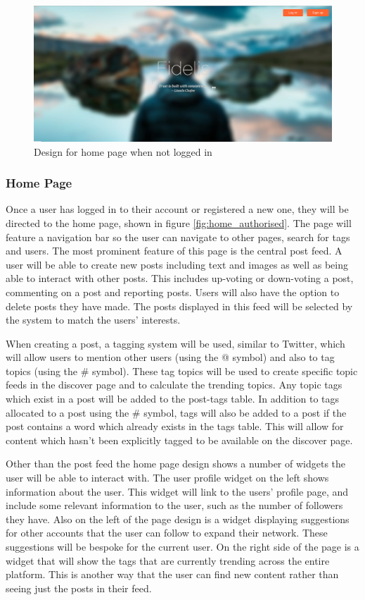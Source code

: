 \begin{figure}[H]
\centering
\includegraphics[width=\linewidth]{Images/Design/home_unauthorised}
\caption{Design for home page when not logged in}
\label{fig:home_unauthorised}
\end{figure}

\subsubsection{Home Page}
Once a user has logged in to their account or registered a new one, they will be directed to the home page, shown in figure \ref{fig:home_authorised}. The page will feature a navigation bar so the user can navigate to other pages, search for tags and users. The most prominent feature of this page is the central post feed. A user will be able to create new posts including text and images as well as being able to interact with other posts. This includes up-voting or down-voting a post, commenting on a post and reporting posts. Users will also have the option to delete posts they have made. The posts displayed in this feed will be selected by the system to match the users' interests.

When creating a post, a tagging system will be used, similar to Twitter, which will allow users to mention other users (using the @ symbol) and also to tag topics (using the \# symbol). These tag topics will be used to create specific topic feeds in the discover page and to calculate the trending topics. Any topic tags which exist in a post will be added to the post-tags table. In addition to tags allocated to a post using the \# symbol, tags will also be added to a post if the post contains a word which already exists in the tags table. This will allow for content which hasn't been explicitly tagged to be available on the discover page.

Other than the post feed the home page design shows a number of widgets the user will be able to interact with. The user profile widget on the left shows information about the user. This widget will link to the users' profile page, and include some relevant information to the user, such as the number of followers they have. Also on the left of the page design is a widget displaying suggestions for other accounts that the user can follow to expand their network. These suggestions will be bespoke for the current user. On the right side of the page is a widget that will show the tags that are currently trending across the entire platform. This is another way that the user can find new content rather than seeing just the posts in their feed.


